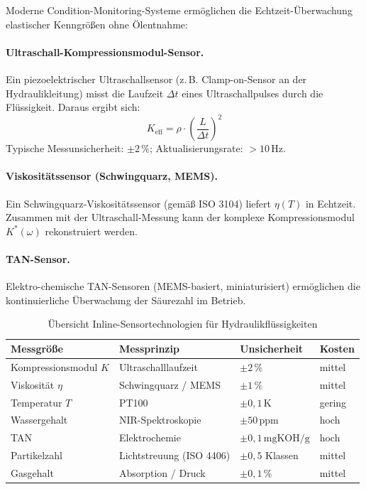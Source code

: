 ﻿\documentclass[a4paper,12pt]{scrreprt}
\theoremstyle{definition}
\begin{document}
Moderne Condition-Monitoring-Systeme ermöglichen die Echtzeit-Überwachung
elastischer Kenngrößen ohne Ölentnahme:

\paragraph{Ultraschall-Kompressionsmodul-Sensor.}
Ein piezoelektrischer Ultraschallsensor (z.\,B. Clamp-on-Sensor an
der Hydraulikleitung) misst die Laufzeit $\Delta t$ eines Ultraschallpulses
durch die Flüssigkeit. Daraus ergibt sich:
\begin{equation}
  K_{\mathrm{eff}} = \rho \cdot \left(\frac{L}{\Delta t}\right)^2
  \label{eq:ultraschall_sensor}
\end{equation}
Typische Messunsicherheit: $\pm 2\,\%$; Aktualisierungsrate: $> 10\,\mathrm{Hz}$.

\paragraph{Viskositätssensor (Schwingquarz, MEMS).}
Ein Schwingquarz-Viskositätssensor (gemäß ISO 3104) liefert $\eta(T)$
in Echtzeit. Zusammen mit der Ultraschall-Messung kann der komplexe
Kompressionsmodul $K^*(\omega)$ rekonstruiert werden.

\paragraph{TAN-Sensor.}
Elektro-chemische TAN-Sensoren (MEMS-basiert, miniaturisiert) ermöglichen
die kontinuierliche Überwachung der Säurezahl im Betrieb.

\begin{table}[H]
  \centering
  \caption{Übersicht Inline-Sensortechnologien für Hydraulikflüssigkeiten}
  \label{tab:sensoren}
  \begin{tabular}{p{3.5cm}p{2.8cm}p{2.8cm}p{2.5cm}}
    \toprule
    \textbf{Messgröße}      & \textbf{Messprinzip}  & \textbf{Unsicherheit}
      & \textbf{Kosten} \\
    \midrule
    Kompressionsmodul $K$  & Ultraschalllaufzeit    & $\pm 2\,\%$     & mittel \\
    Viskosität $\eta$      & Schwingquarz / MEMS    & $\pm 1\,\%$     & mittel \\
    Temperatur $T$         & PT100                  & $\pm 0{,}1\,\mathrm{K}$ & gering \\
    Wassergehalt           & NIR-Spektroskopie      & $\pm 50\,\mathrm{ppm}$   & hoch   \\
    TAN                    & Elektrochemie          & $\pm 0{,}1\,\mathrm{mgKOH/g}$ & hoch \\
    Partikelzahl           & Lichtstreuung (ISO 4406)& $\pm 0{,}5$ Klassen & mittel \\
    Gasgehalt              & Absorption / Druck     & $\pm 0{,}1\,\%$ & mittel \\
    \bottomrule
  \end{tabular}
\end{table}
\end{document}
